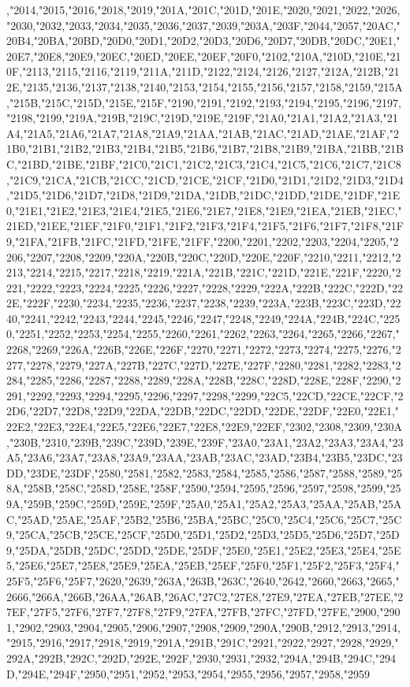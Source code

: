 ,"2014,"2015,"2016,"2018,"2019,"201A,"201C,"201D,"201E,"2020,"2021,"2022,"2026,"2030,"2032,"2033,"2034,"2035,"2036,"2037,"2039,"203A,"203F,"2044,"2057,"20AC,"20B4,"20BA,"20BD,"20D0,"20D1,"20D2,"20D3,"20D6,"20D7,"20DB,"20DC,"20E1,"20E7,"20E8,"20E9,"20EC,"20ED,"20EE,"20EF,"20F0,"2102,"210A,"210D,"210E,"210F,"2113,"2115,"2116,"2119,"211A,"211D,"2122,"2124,"2126,"2127,"212A,"212B,"212E,"2135,"2136,"2137,"2138,"2140,"2153,"2154,"2155,"2156,"2157,"2158,"2159,"215A,"215B,"215C,"215D,"215E,"215F,"2190,"2191,"2192,"2193,"2194,"2195,"2196,"2197,"2198,"2199,"219A,"219B,"219C,"219D,"219E,"219F,"21A0,"21A1,"21A2,"21A3,"21A4,"21A5,"21A6,"21A7,"21A8,"21A9,"21AA,"21AB,"21AC,"21AD,"21AE,"21AF,"21B0,"21B1,"21B2,"21B3,"21B4,"21B5,"21B6,"21B7,"21B8,"21B9,"21BA,"21BB,"21BC,"21BD,"21BE,"21BF,"21C0,"21C1,"21C2,"21C3,"21C4,"21C5,"21C6,"21C7,"21C8,"21C9,"21CA,"21CB,"21CC,"21CD,"21CE,"21CF,"21D0,"21D1,"21D2,"21D3,"21D4,"21D5,"21D6,"21D7,"21D8,"21D9,"21DA,"21DB,"21DC,"21DD,"21DE,"21DF,"21E0,"21E1,"21E2,"21E3,"21E4,"21E5,"21E6,"21E7,"21E8,"21E9,"21EA,"21EB,"21EC,"21ED,"21EE,"21EF,"21F0,"21F1,"21F2,"21F3,"21F4,"21F5,"21F6,"21F7,"21F8,"21F9,"21FA,"21FB,"21FC,"21FD,"21FE,"21FF,"2200,"2201,"2202,"2203,"2204,"2205,"2206,"2207,"2208,"2209,"220A,"220B,"220C,"220D,"220E,"220F,"2210,"2211,"2212,"2213,"2214,"2215,"2217,"2218,"2219,"221A,"221B,"221C,"221D,"221E,"221F,"2220,"2221,"2222,"2223,"2224,"2225,"2226,"2227,"2228,"2229,"222A,"222B,"222C,"222D,"222E,"222F,"2230,"2234,"2235,"2236,"2237,"2238,"2239,"223A,"223B,"223C,"223D,"2240,"2241,"2242,"2243,"2244,"2245,"2246,"2247,"2248,"2249,"224A,"224B,"224C,"2250,"2251,"2252,"2253,"2254,"2255,"2260,"2261,"2262,"2263,"2264,"2265,"2266,"2267,"2268,"2269,"226A,"226B,"226E,"226F,"2270,"2271,"2272,"2273,"2274,"2275,"2276,"2277,"2278,"2279,"227A,"227B,"227C,"227D,"227E,"227F,"2280,"2281,"2282,"2283,"2284,"2285,"2286,"2287,"2288,"2289,"228A,"228B,"228C,"228D,"228E,"228F,"2290,"2291,"2292,"2293,"2294,"2295,"2296,"2297,"2298,"2299,"22C5,"22CD,"22CE,"22CF,"22D6,"22D7,"22D8,"22D9,"22DA,"22DB,"22DC,"22DD,"22DE,"22DF,"22E0,"22E1,"22E2,"22E3,"22E4,"22E5,"22E6,"22E7,"22E8,"22E9,"22EF,"2302,"2308,"2309,"230A,"230B,"2310,"239B,"239C,"239D,"239E,"239F,"23A0,"23A1,"23A2,"23A3,"23A4,"23A5,"23A6,"23A7,"23A8,"23A9,"23AA,"23AB,"23AC,"23AD,"23B4,"23B5,"23DC,"23DD,"23DE,"23DF,"2580,"2581,"2582,"2583,"2584,"2585,"2586,"2587,"2588,"2589,"258A,"258B,"258C,"258D,"258E,"258F,"2590,"2594,"2595,"2596,"2597,"2598,"2599,"259A,"259B,"259C,"259D,"259E,"259F,"25A0,"25A1,"25A2,"25A3,"25AA,"25AB,"25AC,"25AD,"25AE,"25AF,"25B2,"25B6,"25BA,"25BC,"25C0,"25C4,"25C6,"25C7,"25C9,"25CA,"25CB,"25CE,"25CF,"25D0,"25D1,"25D2,"25D3,"25D5,"25D6,"25D7,"25D9,"25DA,"25DB,"25DC,"25DD,"25DE,"25DF,"25E0,"25E1,"25E2,"25E3,"25E4,"25E5,"25E6,"25E7,"25E8,"25E9,"25EA,"25EB,"25EF,"25F0,"25F1,"25F2,"25F3,"25F4,"25F5,"25F6,"25F7,"2620,"2639,"263A,"263B,"263C,"2640,"2642,"2660,"2663,"2665,"2666,"266A,"266B,"26AA,"26AB,"26AC,"27C2,"27E8,"27E9,"27EA,"27EB,"27EE,"27EF,"27F5,"27F6,"27F7,"27F8,"27F9,"27FA,"27FB,"27FC,"27FD,"27FE,"2900,"2901,"2902,"2903,"2904,"2905,"2906,"2907,"2908,"2909,"290A,"290B,"2912,"2913,"2914,"2915,"2916,"2917,"2918,"2919,"291A,"291B,"291C,"2921,"2922,"2927,"2928,"2929,"292A,"292B,"292C,"292D,"292E,"292F,"2930,"2931,"2932,"294A,"294B,"294C,"294D,"294E,"294F,"2950,"2951,"2952,"2953,"2954,"2955,"2956,"2957,"2958,"2959